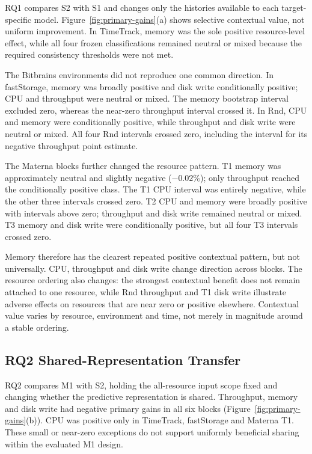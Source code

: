 \documentclass[a4paper,fleqn]{cas-dc}
\begin{document}
RQ1 compares S2 with S1 and changes only the histories available to each
target-specific model. Figure~\ref{fig:primary-gains}(a) shows selective
contextual value, not uniform improvement. In TimeTrack, memory was the sole
positive resource-level effect, while all four frozen classifications remained
neutral or mixed because the required consistency thresholds were not met.

The Bitbrains environments did not reproduce one common direction. In
fastStorage, memory was broadly positive and disk write conditionally positive;
CPU and throughput were neutral or mixed. The memory bootstrap interval
excluded zero, whereas the near-zero throughput interval crossed it. In Rnd,
CPU and memory were conditionally positive, while throughput and disk write
were neutral or mixed. All four Rnd intervals crossed zero, including the
interval for its negative throughput point estimate.

The Materna blocks further changed the resource pattern. T1 memory was
approximately neutral and slightly negative ($-0.02\%$); only throughput
reached the conditionally positive class. The T1 CPU interval was entirely
negative, while the other three intervals crossed zero. T2 CPU and memory
were broadly positive with intervals above zero; throughput and disk write
remained neutral or mixed. T3 memory and disk write were conditionally
positive, but all four T3 intervals crossed zero.

Memory therefore has the clearest repeated positive contextual pattern, but
not universally. CPU, throughput and disk write change direction across
blocks. The resource ordering also changes: the strongest contextual benefit
does not remain attached to one resource, while Rnd throughput and T1 disk
write illustrate adverse effects on resources that are near zero or positive
elsewhere. Contextual value varies by resource, environment and time, not
merely in magnitude around a stable ordering.

\subsection{RQ2 Shared-Representation Transfer}
\label{sec:results-rq2}

RQ2 compares M1 with S2, holding the all-resource input scope fixed and changing
whether the predictive representation is shared. Throughput, memory and disk
write had negative primary gains in all six blocks
(Figure~\ref{fig:primary-gains}(b)). CPU was positive only in TimeTrack,
fastStorage and Materna T1. These small or near-zero exceptions do not support
uniformly beneficial sharing within the evaluated M1 design.
\end{document}
